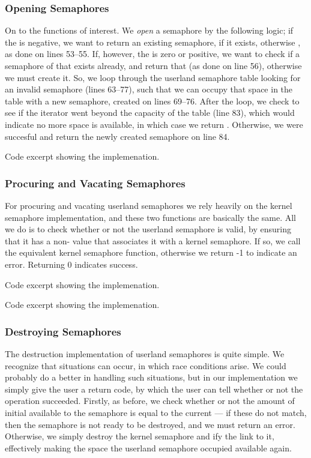 \subsubsection{Opening Semaphores}
On to the functions of interest. We {\it open} a semaphore by the following
logic; if the  is negative, we want to return an existing
semaphore, if it exists, otherwise , as done on lines 53--55. If,
however, the  is zero or positive, we want to check if a semaphore
of that  exists already, and return that (as done on line 56),
otherwise we must create it. So, we loop through the userland semaphore table
looking for an invalid semaphore (lines 63--77), such that we can occupy that
space in the table with a new semaphore, created on lines 69--76. After the
loop, we check to see if the iterator went beyond the capacity of the table
(line 83), which would indicate no more space is available, in which case we
return . Otherwise, we were succesful and return the newly created
semaphore on line 84.

{Code excerpt showing the  implemenation.}

\subsubsection{Procuring and Vacating Semaphores}
For procuring and vacating userland semaphores we rely heavily on the kernel
semaphore implementation, and these two functions are basically the same. All
we do is to check whether or not the userland semaphore is valid, by ensuring
that it has a non- value that associates it with a kernel
semaphore. If so, we call the equivalent kernel semaphore function, otherwise
we return -1 to indicate an error. Returning 0 indicates success.

{Code excerpt showing the  implemenation.}

{Code excerpt showing the  implemenation.}

\subsubsection{Destroying Semaphores}
The destruction implementation of userland semaphores is quite simple. We
recognize that situations can occur, in which race conditions arise. We could
probably do a better in handling such situations, but in our implementation
we simply give the user a return code, by which the user can tell whether or
not the operation succeeded. Firstly, as before, we check whether or not the
amount of initial  available to the semaphore is equal to the
current  --- if these do not match, then the semaphore is not
ready to be destroyed, and we must return an error. Otherwise, we simply
destroy the kernel semaphore and ify the link to it, effectively
making the space the userland semaphore occupied available again.
 
